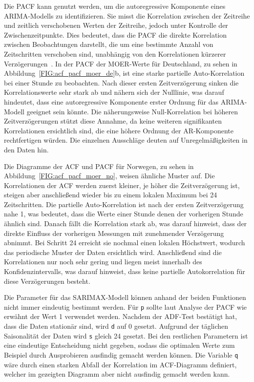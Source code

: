 Die \ac{PACF} kann genutzt werden, um die autoregressive Komponente eines \ac{ARIMA}-Modells zu identifizieren.
Sie misst die Korrelation zwischen der Zeitreihe und zeitlich verschobenen Werten der Zeitreihe, jedoch unter Kontrolle der Zwischenzeitpunkte.
Dies bedeutet, dass die \ac{PACF} die direkte Korrelation zwischen Beobachtungen darstellt, die um eine bestimmte Anzahl von Zeitschritten verschoben sind, unabhängig von den Korrelationen kürzerer Verzögerungen~\cite{Peixeiro.2022}.
In der \ac{PACF} der \ac{MOER}-Werte für Deutschland, zu sehen in Abbildung~\ref{FIG:acf_pacf_moer_de}b, ist eine starke partielle Auto-Korrelation bei einer Stunde zu beobachten.
Nach dieser ersten Zeitverzögerung sinken die Korrelationswerte sehr stark ab und nähern sich der Nulllinie, was darauf hindeutet, dass eine autoregressive Komponente erster Ordnung für das \ac{ARIMA}-Modell geeignet sein könnte.
Die näherungsweise Null-Korrelation bei höheren Zeitverzögerungen stützt diese Annahme, da keine weiteren signifikanten Korrelationen ersichtlich sind, die eine höhere Ordnung der AR-Komponente rechtfertigen würden.
Die einzelnen Ausschläge deuten auf Unregelmäßigkeiten in den Daten hin.

Die Diagramme der \ac{ACF} und \ac{PACF} für Norwegen, zu sehen in Abbildung~\ref{FIG:acf_pacf_moer_no}, weisen ähnliche Muster auf.
Die Korrelationen der \ac{ACF} werden zuerst kleiner, je höher die Zeitverzögerung ist, steigen aber anschließend wieder bis zu einem lokalen Maximum bei 24 Zeitschritten.
Die partielle Auto-Korrelation ist nach der ersten Zeitverzögerung nahe 1, was bedeutet, dass die Werte einer Stunde denen der vorherigen Stunde ähnlich sind.
Danach fällt die Korrelation stark ab, was darauf hinweist, dass der direkte Einfluss der vorherigen Messungen mit zunehmender Verzögerung abnimmt.
Bei Schritt 24 erreicht sie nochmal einen lokalen Höchstwert, wodurch das periodische Muster der Daten ersichtlich wird.
Anschließend sind die Korrelationen nur noch sehr gering und liegen meist innerhalb des Konfidenzintervalls, was darauf hinweist, dass keine partielle Autokorrelation für diese Verzögerungen besteht.

Die Parameter für das SARIMAX-Modell können anhand der beiden Funktionen nicht immer eindeutig bestimmt werden.
Für \lstinline[columns=fixed]{p} sollte laut Analyse der \ac{PACF} wie erwähnt der Wert 1 verwendet werden.
Nachdem der \ac{ADF}-Test bestätigt hat, dass die Daten stationär sind, wird \lstinline[columns=fixed]{d} auf 0 gesetzt.
Aufgrund der täglichen Saisonalität der Daten wird \lstinline[columns=fixed]{s} gleich 24 gesetzt.
Bei den restlichen Parametern ist eine eindeutige Entscheidung nicht gegeben, sodass die optimalen Werte zum Beispiel durch Ausprobieren ausfindig gemacht werden können.
Die Variable \lstinline[columns=fixed]{q} wäre durch einen starken Abfall der Korrelation im \ac{ACF}-Diagramm definiert, welcher im gezeigten Diagramm aber nicht ausfindig gemacht werden kann.

